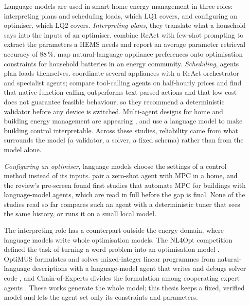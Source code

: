Language models are used in smart home energy management in three
roles: interpreting plans and scheduling loads, which LQ1 covers, and
configuring an optimiser, which LQ2 covers. \textit{Interpreting
plans}, they translate what a household says into the inputs of an
optimiser. \textcite{michelon2025} combine ReAct with few-shot
prompting to extract the parameters a HEMS needs and report an average
parameter retrieval accuracy of 88\,\%. \textcite{sanguinetti2025} map
natural-language appliance preferences onto optimisation constraints
for household batteries in an energy community. \textit{Scheduling},
agents plan loads themselves. \textcite{elmakroum2026} coordinate
several appliances with a ReAct orchestrator and specialist agents;
\textcite{jonah2026} compare tool-calling agents on half-hourly prices
and find that native function calling outperforms text-parsed actions
and that low cost does not guarantee feasible behaviour, so they
recommend a deterministic validator before any device is switched.
Multi-agent designs for home and building energy management are
appearing \parencite{jung2026,yang2025,liu2025}, and
\textcite{zhang2024} use a language model to make building control
interpretable. Across these studies, reliability came
from what surrounds the model (a validator, a solver, a fixed schema)
rather than from the model alone.

\textit{Configuring an optimiser}, language models choose the settings
of a control method instead of its inputs. \textcite{raghavan2025} pair
a zero-shot agent with MPC in a home, and the review's pre-screen found
first studies that automate MPC for buildings with language-model
agents, which are read in full before the gap is final. None of the
studies read so far compares such an agent with a deterministic tuner
that sees the same history, or runs it on a small local model.

The interpreting role has a counterpart outside the energy domain, where
language models write whole optimisation models. The NL4Opt competition
defined the task of turning a word problem into an optimisation model
\parencite{ramamonjison2023}. OptiMUS formulates and solves
mixed-integer linear programmes from natural-language descriptions with
a language-model agent that writes and debugs solver code
\parencite{ahmaditeshnizi2024}, and Chain-of-Experts divides the
formulation among cooperating expert agents \parencite{xiao2024}. These
works generate the whole model; this thesis keeps a fixed, verified
model and lets the agent set only its constraints and parameters.


